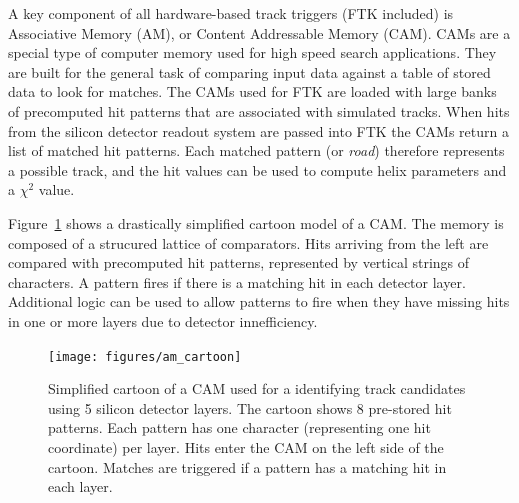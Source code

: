\documentclass[preprint,prd,showpacs]{revtex4-1}
\begin{document}
A key component of all hardware-based track triggers (FTK included) is Associative Memory (AM), or Content Addressable Memory (CAM). CAMs are a special type of computer memory used for high speed search applications. They are built for the general task of comparing input data against a table of stored data to look for matches. The CAMs used for FTK are loaded with large banks of precomputed hit patterns that are associated with simulated tracks. When hits from the silicon detector readout system are passed into FTK the CAMs return a list of matched hit patterns. Each matched pattern (or \textit{road}) therefore represents a possible track, and the hit values can be used to compute helix parameters and a $\chi^{2}$ value.

Figure~\ref{fig:am_cartoon} shows a drastically simplified cartoon model of a CAM. The memory is composed of a strucured lattice of comparators. Hits arriving from the left are compared with precomputed hit patterns, represented by vertical strings of characters. A pattern fires if there is a matching hit in each detector layer. Additional logic can be used to allow patterns to fire when they have missing hits in one or more layers due to detector innefficiency.

\begin{figure}[!htb]
\begin{center}
\texttt{[image: figures/am\_cartoon]}
\caption{Simplified cartoon of a CAM used for a identifying track candidates using 5 silicon detector layers. The cartoon shows 8 pre-stored hit patterns. Each pattern has one character (representing one hit coordinate) per layer. Hits enter the CAM on the left side of the cartoon. Matches are triggered if a pattern has a matching hit in each layer.}
\label{fig:am_cartoon}
\end{center}
\end{figure}



\end{document}
